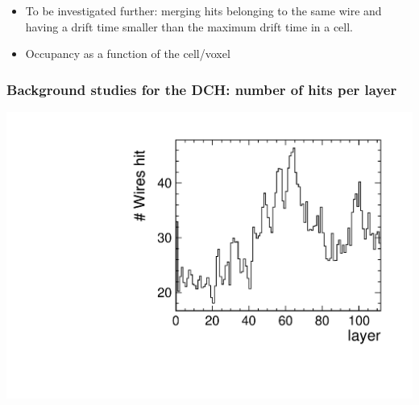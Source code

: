 \documentclass[aspectratio=169, hyperref={colorlinks=true,pdfpagelabels=false,linkcolor=black}, xcolor=dvipsnames,10pt]{beamer}
\begin{document}
\begin{frame}
\begin{columns}[t]
	\end{columns}
	
	\begin{itemize}
	\item To be investigated further: merging hits belonging to the same wire and having a drift time smaller than the maximum drift time in a cell.
	\item Occupancy as a function of the cell/voxel
	\end{itemize}		
	
\end{frame}

\begin{frame}
	\frametitle{Background studies for the DCH: number of hits per layer}

	
	\centering
	\includegraphics[width=\textwidth]{../figures/DCH/DCH_hits_layer.pdf}
		
	
	
\end{frame}
\end{document}
